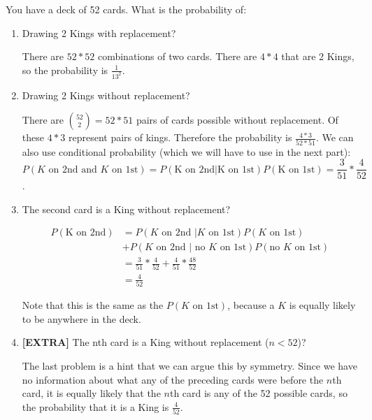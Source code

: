 \question You have a deck of 52 cards. What is the probability of:
\begin{enumerate}[label=(\alph*)]

\item Drawing 2 Kings with replacement?
\begin{solution}
There are $52*52$ combinations of two 
cards. There are $4*4$ that are 2 Kings, so the probability is 
$\frac{1}{13^2}$.
 \end{solution}
 
\item Drawing 2 Kings without replacement?
\begin{solution}
There are ${52 \choose 2} = 52*51$ pairs of cards possible without replacement. 
Of these $4*3$ represent pairs of kings. Therefore the 
probability is $\frac{4*3}{52*51}$.
We can also use conditional probability (which we will have to use in 
the next part):
\[P(K \text{ on 2nd and } K \text{ on 1st}) = P(\text{K on 2nd} | 
\text{K on 1st}) P(\text{K on 1st}) = \frac{3}{51}*\frac{4}{52}\].
 \end{solution}
 
\item The second card is a King without replacement?
\begin{solution}
\begin{equation}
\begin{split}
P(\text{K on 2nd}) &= P(K \text{ on 2nd }| K \text{ on 1st}) P(K \text{ on 1st}) \\
& + P(K \text{ on 2nd }| \text{ no $K$ on 1st}) P(\text{no $K$ on 1st}) \\
&= \frac{3}{51}*\frac{4}{52} + \frac{4}{51}*\frac{48}{52}  \\
&= \frac{4}{52}
\end{split}
\end{equation}

Note that this is the same as the $P(K\text{ on 1st})$, because a $K$ 
is equally likely to be anywhere in the deck.
 \end{solution}
 
\item \textbf{[EXTRA]} The nth card is a King without replacement ($n < 52$)?
\begin{solution} [1 cm]
The last problem is a hint that we can argue this by symmetry. Since 
we have no information about what any of the preceding cards were 
before the $n$th card, it is equally likely that the $n$th card is any of the 52 
possible cards, so the probability that it is a King is 
$\frac{4}{52}$.
\end{solution}

\end{enumerate}
